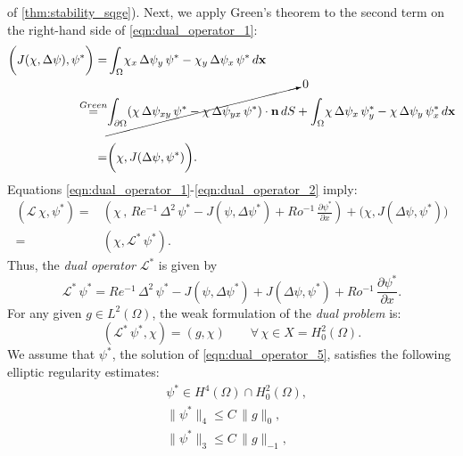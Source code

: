 of \autoref{thm:stability_sqge}).
Next, we apply Green's theorem to the second term on the right-hand side of
\eqref{eqn:dual_operator_1}:
\begin{align}
  \biggl( J(\chi , \Delta \psi) , \psi^* \biggr) =& \int_{\Omega}\! \chi_x \,
    \Delta \psi_y \, \psi^* - \chi_y \, \Delta \psi_x \, \psi^* \nonumber\,
    d\mathbf{x} \\
  \stackrel{Green}{=}& \cancelto{0}{\int_{\partial \Omega}\!
      \left(\chi \, \Delta \psi_{x y} \, \psi^* - \chi \, \Delta \psi_{y x} \,
      \psi^* \right) \cdot \mathbf{n} \, dS}
    + \int_{\Omega}\! \chi \, \Delta \psi_x \, \psi^*_y
      - \chi \, \Delta \psi_y \, \psi^*_x\, d\mathbf{x} \nonumber \\[1em]
  =& \biggl( \chi , J(\Delta \psi , \psi^*) \biggr) .
  \label{eqn:dual_operator_2}
\end{align}
Equations \eqref{eqn:dual_operator_1}-\eqref{eqn:dual_operator_2} imply:
\begin{align}
  (\mathcal{L} \, \chi , \psi^*) =& \left( \chi \, , \, Re^{-1} \, \Delta^2 \, \psi^*
    - J(\psi , \Delta \psi^* ) + Ro^{-1} \, \frac{\partial \psi^*}{\partial x} \right)
    + \biggl( \chi , J(\Delta \psi , \psi^*) \biggr) \nonumber \\
  =& ( \chi , \mathcal{L}^* \, \psi^*) .
  \label{eqn:dual_operator_3}
\end{align}
Thus, the \emph{dual operator} $\mathcal{L}^*$ is given by
\begin{equation}
  \mathcal{L}^* \, \psi^* = Re^{-1} \, \Delta^2 \, \psi^* - J(\psi , \Delta \psi^* )
    + J(\Delta \psi , \psi^* ) + Ro^{-1} \, \frac{\partial \psi^*}{\partial x} .
  \label{eqn:dual_operator_4}
\end{equation}
For any given $g \in L^2(\Omega)$, the weak formulation of the \emph{dual
problem} is:
\begin{equation}
  ( \mathcal{L}^* \, \psi^* , \chi ) = (g , \chi)
    \qquad \forall \, \chi \in X = H_0^2(\Omega) .
  \label{eqn:dual_operator_5}
\end{equation}
We assume that $\psi^*$, the solution of \eqref{eqn:dual_operator_5}, satisfies
the following elliptic regularity estimates:
\begin{align}
  & \psi^* \in H^4(\Omega) \cap H^2_0(\Omega), \label{eqn:dual_operator_6a} \\[0.2cm]
  & \| \psi^* \|_4 \le C \, \|g\|_{0}, \label{eqn:dual_operator_6b} \\[0.2cm]
  & \| \psi^* \|_3 \le C \, \|g\|_{-1}, \label{eqn:dual_operator_6c}
\end{align}
